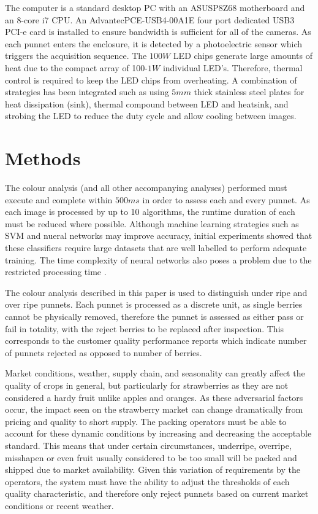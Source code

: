\documentclass[fleqn,twoside,12pt]{report}
\begin{document}
The computer is a standard desktop PC with an ASUS\textregistered P8Z68 motherboard and an 8-core i7 CPU. An Advantec\textregistered PCE-USB4-00A1E four port dedicated USB3 PCI-e card is installed to ensure bandwidth is sufficient for all of the cameras. As each punnet enters the enclosure, it is detected by a photoelectric sensor which triggers the acquisition sequence. The $100W$ LED chips generate large amounts of heat due to the compact array of 100-$1W$ individual LED's. Therefore, thermal control is required to keep the LED chips from overheating. A combination of strategies has been integrated such as using $5mm$ thick stainless steel plates for heat dissipation (sink), thermal compound between LED and heatsink, and strobing the LED to reduce the duty cycle and allow cooling between images.  

\section{Methods}
\label{sec:colour_analysis}

The colour analysis (and all other accompanying analyses) performed must execute and complete within $500ms$ in order to assess each and every punnet. As each image is processed by up to 10 algorithms, the runtime duration of each must be reduced where possible. Although machine learning strategies such as SVM and nueral networks may improve accuracy, initial experiments showed that these classifiers require large datasets that are well labelled to perform adequate training. The time complexity of neural networks also poses a problem due to the restricted processing time \cite{he, angiulli}. 

The colour analysis described in this paper is used to distinguish under ripe and over ripe punnets. Each punnet is processed as a discrete unit, as single berries cannot be physically removed, therefore the punnet is assessed as either pass or fail in totality, with the reject berries to be replaced after inspection. This corresponds to the customer quality performance reports which indicate number of punnets rejected as opposed to number of berries. 

Market conditions, weather, supply chain, and seasonality can greatly affect the quality of crops in general, but particularly for strawberries as they are not considered a hardy fruit unlike apples and oranges. As these adversarial factors occur, the impact seen on the strawberry market can change dramatically from pricing and quality to short supply. The packing operators must be able to account for these dynamic conditions by increasing and decreasing the acceptable standard. This means that under certain circumstances, underripe, overripe, misshapen or even fruit usually considered to be too small will be packed and shipped due to market availability. Given this variation of requirements by the operators, the system must have the ability to adjust the thresholds of each quality characteristic, and therefore only reject punnets based on current market conditions or recent weather. 
\end{document}
